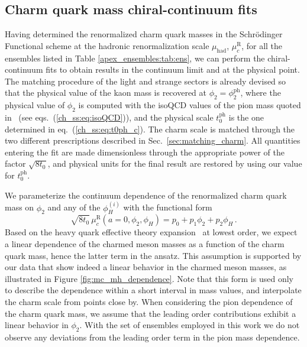 
\subsection{Charm quark mass chiral-continuum fits}
\label{subsec:mc_chiral_continuum}

Having determined the  renormalized charm quark masses in the Schr\"odinger Functional scheme at the hadronic renormalization scale $\mu_{\mathrm{had}}$, $\mu_c^{\textrm{R}}$, for all the ensembles listed in Table \ref{apex_ensembles:tab:ens}, we can perform the chiral-continuum fits to obtain results in the continuum limit and at the physical point. The matching procedure of the light
and strange sectors is already devised so that the physical value of the kaon mass is recovered
at $\phi_2 = \phi_2^{\mathrm{ph}}$, where the physical value of $\phi_2$ is computed
with the isoQCD values of the pion mass quoted 
in~\cite{FlavourLatticeAveragingGroupFLAG:2021npn} (see eqs.~(\ref{ch_ss:eq:isoQCD})), and the physical scale $t_0^{\mathrm{ph}}$
is the one determined in eq.~(\ref{ch_ss:eq:t0ph_c}). The charm scale is matched through the two different
prescriptions described in Sec.~\ref{sec:matching_charm}. All quantities entering the fit
are made dimensionless through the appropriate power of the factor $\sqrt{8t_0}$,
and physical units for the final result are restored by using our value for $t_0^{\mathrm{ph}}$.

We parameterize the continuum dependence of the renormalized charm quark mass on $\phi_2$
and any of the $\phi_H^{(i)}$ with the functional form
\begin{equation}
	\sqrt{8t_0}\, \mu_c^{\textrm{R}}(a=0, \phi_2, \phi_H) = p_0 + p_1\phi_2 + p_2\phi_H\,.
	\label{eq:mc_continuum_parameterization}
\end{equation}
Based on the heavy quark effective theory expansion~\cite{Georgi:1990um} at lowest order,
we expect a linear dependence of the charmed meson masses as a function of the charm quark 
mass, hence the latter term in the ansatz. This assumption is supported by our data that show indeed a 
linear behavior in the charmed meson masses, as illustrated in Figure \ref{fig:mc_mh_dependence}. Note that this form is used only to describe the dependence
within a short interval in mass values, and interpolate the charm scale from points close by. When considering the pion dependence of the charm quark mass, we assume that the  leading order contributions exhibit a linear behavior in $\phi_2$. With the set of ensembles employed in this work we do not observe any deviations from the leading order term in the pion mass dependence.

